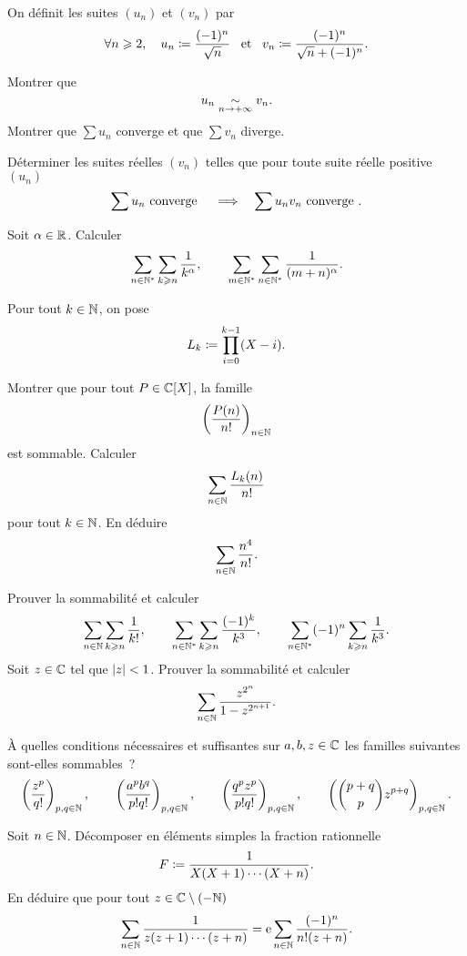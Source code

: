 \documentclass{magnolia}
\begin{document}

On définit les suites $(u_n)$ et $(v_n)$ par
\[\forall n\geqslant 2,\quad u_n \coloneqq \frac{(-1)^n}{\sqrt{n}} \quad\!\text{et}\quad\!
  v_n \coloneqq \frac{(-1)^n}{\sqrt{n}+(-1)^n}.\]
\begin{questions}
\question Montrer que \[u_n \underset{n\rightarrow +\infty}{\sim} v_n.\]
\question Montrer que $\sum u_n$ converge et que $\sum v_n$ diverge.
\end{questions}

Déterminer les suites réelles $(v_n)$ telles que pour toute suite réelle positive $(u_n)$
\[\sum u_n \text{ converge } \quad\Longrightarrow\quad \sum u_n v_n \text{ converge }.\]



Soit $\alpha\in\mathbb{R}$. Calculer
\[\sum_{n\in{\mathbb{N}^*}} \sum_{k\geqslant n} \frac{1}{k^\alpha}, \qquad
  \sum_{m\in{\mathbb{N}^*}}\sum_{n\in{\mathbb{N}^*}} \frac{1}{(m+n)^{\alpha}}.\]


Pour tout $k\in\mathbb{N}$, on pose
\[L_k\coloneqq \prod_{i=0}^{k-1} (X-i).\]
\begin{questions}
\question Montrer que pour tout $P\in\polyC$, la famille
  \[\left(\frac{P(n)}{n!}\right)_{n\in\mathbb{N}}\]
  est sommable.
\question Calculer
  \[\sum_{n\in\mathbb{N}} \frac{L_k(n)}{n!}\]
  pour tout $k\in\mathbb{N}$.
\question En déduire
  \[\sum_{n\in\mathbb{N}} \frac{n^4}{n!}.\]
\end{questions}

\begin{questions}
\question Prouver la sommabilité et calculer
\[\sum_{n\in\mathbb{N}} \sum_{k\geqslant n} \frac{1}{k!}, \qquad
  \sum_{n\in{\mathbb{N}^*}} \sum_{k\geqslant n} \frac{(-1)^k}{k^3}, \qquad
  \sum_{n\in{\mathbb{N}^*}} (-1)^n \sum_{k\geqslant n} \frac{1}{k^3}.\]
\question Soit $z\in\mathbb{C}$ tel que $\left|z\right|<1$. Prouver la sommabilité et calculer
  \[\sum_{n\in\mathbb{N}} \frac{z^{2^n}}{1-z^{2^{n+1}}}.\]
\end{questions}

À quelles conditions nécessaires et suffisantes sur $a,b,z\in\mathbb{C}$ les familles suivantes
sont-elles sommables~?
\[\left(\frac{z^p}{q!}\right)_{p,q\in\mathbb{N}}, \qquad
  \left(\frac{a^p b^q}{p!q!}\right)_{p,q\in\mathbb{N}}, \qquad
  \left(\frac{q^p z^p}{p!q!}\right)_{p,q\in\mathbb{N}}, \qquad
  \left(\binom{p+q}{p}z^{p+q}\right)_{p,q\in\mathbb{N}}.\]

\begin{questions}
\question Soit $n\in\mathbb{N}$. Décomposer en éléments simples la fraction rationnelle
  \[F\coloneqq \frac{1}{X(X+1)\cdots(X+n)}.\]
\question En déduire que pour tout $z\in\mathbb{C}\setminus(-\mathbb{N})$
  \[\sum_{n\in\mathbb{N}} \frac{1}{z(z+1)\cdots(z+n)}={\rm e}\sum_{n\in\mathbb{N}} \frac{(-1)^n}{n!(z+n)}.\]
\end{questions}










%



\end{document}
